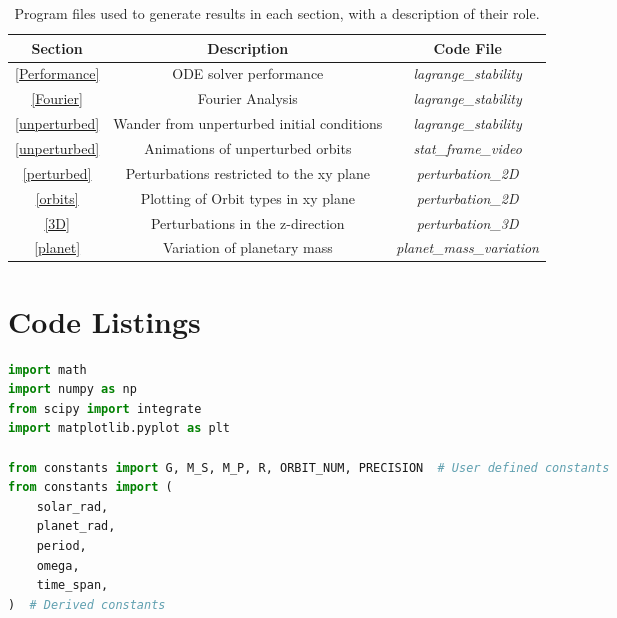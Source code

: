 \documentclass[11pt, a4paper,twocolumn]{article} %
\begin{document}
\begin{appendices}
\begin{table}[ht]
	\caption{Program files used to generate results in each section, with a description of their role.}
	\centering
	\begin{tabular}{|c|c|c|}
		\hline
		\textbf{Section} & \textbf{Description} & \textbf{Code File} \\
		\hline \hline
		\ref{Performance} & ODE solver performance & \textit{lagrange\_stability} \\
		\hline
		\ref{Fourier} & Fourier Analysis & \textit{lagrange\_stability} \\
		\hline
		\ref{unperturbed} & Wander from unperturbed initial conditions & \textit{lagrange\_stability} \\
		\hline
		\ref{unperturbed} & Animations of unperturbed orbits & \textit{stat\_frame\_video} \\
		\hline
		\ref{perturbed}& Perturbations restricted to the xy plane & \textit{perturbation\_2D} \\
		\hline
		\ref{orbits}& Plotting of Orbit types in xy plane & \textit{perturbation\_2D} \\
		\hline
		\ref{3D}& Perturbations in the z-direction & \textit{perturbation\_3D} \\
		\hline
		\ref{planet}& Variation of planetary mass & \textit{planet\_mass\_variation} \\
		\hline
	\end{tabular}
	\label{Codefiles}
\end{table}


\section{Code Listings} \label{Code}
\begin{lstlisting}[language=Python]
import math
import numpy as np
from scipy import integrate
import matplotlib.pyplot as plt

from constants import G, M_S, M_P, R, ORBIT_NUM, PRECISION  # User defined constants
from constants import (
	solar_rad,
	planet_rad,
	period,
	omega,
	time_span,
)  # Derived constants


\end{lstlisting}

\end{appendices}
\end{document}
